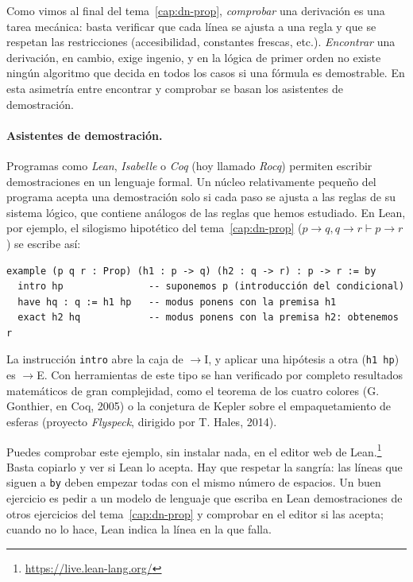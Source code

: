 Como vimos al final del tema~\ref{cap:dn-prop}, \emph{comprobar} una derivación es una tarea mecánica: basta verificar que cada línea se ajusta a una regla y que se respetan las restricciones (accesibilidad, constantes frescas, etc.). \emph{Encontrar} una derivación, en cambio, exige ingenio, y en la lógica de primer orden no existe ningún algoritmo que decida en todos los casos si una fórmula es demostrable. En esta asimetría entre encontrar y comprobar se basan los asistentes de demostración.

\paragraph{Asistentes de demostración.} Programas como \emph{Lean}, \emph{Isabelle} o \emph{Coq} (hoy llamado \emph{Rocq}) permiten escribir demostraciones en un lenguaje formal. Un núcleo relativamente pequeño del programa acepta una demostración solo si cada paso se ajusta a las reglas de su sistema lógico, que contiene análogos de las reglas que hemos estudiado. En Lean, por ejemplo, el silogismo hipotético del tema~\ref{cap:dn-prop} ($p \to q, q \to r \vdash p \to r$) se escribe así:
\begin{verbatim}
example (p q r : Prop) (h1 : p -> q) (h2 : q -> r) : p -> r := by
  intro hp               -- suponemos p (introducción del condicional)
  have hq : q := h1 hp   -- modus ponens con la premisa h1
  exact h2 hq            -- modus ponens con la premisa h2: obtenemos r
\end{verbatim}
La instrucción \texttt{intro} abre la caja de $\to$I, y aplicar una hipótesis a otra (\texttt{h1 hp}) es $\to$E. Con herramientas de este tipo se han verificado por completo resultados matemáticos de gran complejidad, como el teorema de los cuatro colores (G. Gonthier, en Coq, 2005) o la conjetura de Kepler sobre el empaquetamiento de esferas (proyecto \emph{Flyspeck}, dirigido por T. Hales, 2014).

Puedes comprobar este ejemplo, sin instalar nada, en el editor web de Lean.\footnote{\url{https://live.lean-lang.org/}} Basta copiarlo y ver si Lean lo acepta. Hay que respetar la sangría: las líneas que siguen a \texttt{by} deben empezar todas con el mismo número de espacios. Un buen ejercicio es pedir a un modelo de lenguaje que escriba en Lean demostraciones de otros ejercicios del tema~\ref{cap:dn-prop} y comprobar en el editor si las acepta; cuando no lo hace, Lean indica la línea en la que falla.

